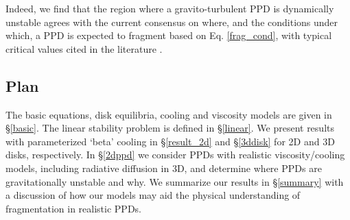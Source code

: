 \documentclass[iop, numberedappendix]{emulateapj}
\begin{document}
Indeed, we find that the region where a gravito-turbulent PPD is
dynamically unstable agrees with the current consensus on  where, and
the conditions under which, a PPD is expected to fragment based on
Eq. \ref{frag_cond}, with typical critical values cited in the
literature \citep[e.g. $\beta_c\sim
  3,\,\alpha_c\sim0.1$,][]{gammie01,rice05}.    
   
\subsection{Plan}\label{plan}

The basic equations, disk equilibria, cooling and viscosity models are 
given in \S\ref{basic}. The linear stability problem is defined in 
\S\ref{linear}. We present results with parameterized `beta' cooling in 
\S\ref{result_2d} and \S\ref{3ddisk} for 2D and 3D disks,
respectively. %
In \S\ref{2dppd} we consider PPDs with realistic viscosity/cooling   
models, including radiative diffusion in 3D, and determine where PPDs
are gravitationally unstable and why. We summarize our results in
\S\ref{summary} with a discussion of how our models may aid the 
physical understanding of fragmentation in realistic PPDs.   





 




\appendix




\end{document}
